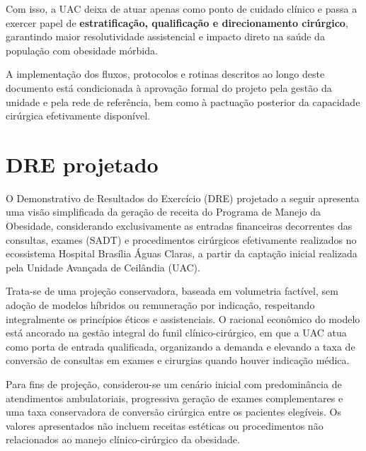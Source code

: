 \documentclass[12pt]{article}
\begin{document}
Com isso, a UAC deixa de atuar apenas como ponto de cuidado clínico e passa a exercer papel de \textbf{estratificação, qualificação e direcionamento cirúrgico}, garantindo maior resolutividade assistencial e impacto direto na saúde da população com obesidade mórbida.

A implementação dos fluxos, protocolos e rotinas descritos ao longo deste documento está condicionada à aprovação formal do projeto pela gestão da unidade e pela rede de referência, bem como à pactuação posterior da capacidade cirúrgica efetivamente disponível.

\FGVNewPage
\section{DRE projetado}
\label{sec:org968080e}
O Demonstrativo de Resultados do Exercício (DRE) projetado a seguir apresenta uma visão simplificada da geração de receita do Programa de Manejo da Obesidade, considerando exclusivamente as entradas financeiras decorrentes das consultas, exames (SADT) e procedimentos cirúrgicos efetivamente realizados no ecossistema Hospital Brasília Águas Claras, a partir da captação inicial realizada pela Unidade Avançada de Ceilândia (UAC).

Trata-se de uma projeção conservadora, baseada em volumetria factível, sem adoção de modelos híbridos ou remuneração por indicação, respeitando integralmente os princípios éticos e assistenciais. O racional econômico do modelo está ancorado na gestão integral do funil clínico-cirúrgico, em que a UAC atua como porta de entrada qualificada, organizando a demanda e elevando a taxa de conversão de consultas em exames e cirurgias quando houver indicação médica.

Para fins de projeção, considerou-se um cenário inicial com predominância de atendimentos ambulatoriais, progressiva geração de exames complementares e uma taxa conservadora de conversão cirúrgica entre os pacientes elegíveis. Os valores apresentados não incluem receitas estéticas ou procedimentos não relacionados ao manejo clínico-cirúrgico da obesidade.
\end{document}
